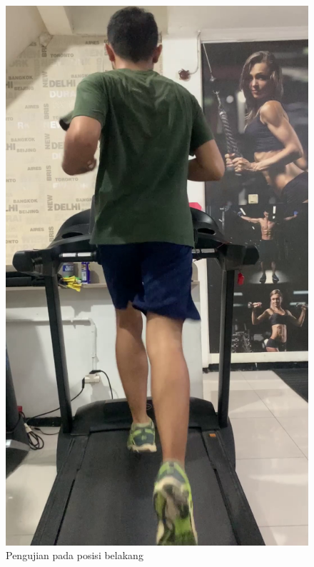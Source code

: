 \begin{figure}[H]
  \centering
  \includegraphics[scale=0.4]{gambar/posisi_belakang.png}
  \caption{Pengujian pada posisi belakang}
  \label{fig:PengujianPosisiBelakang}
\end{figure}

